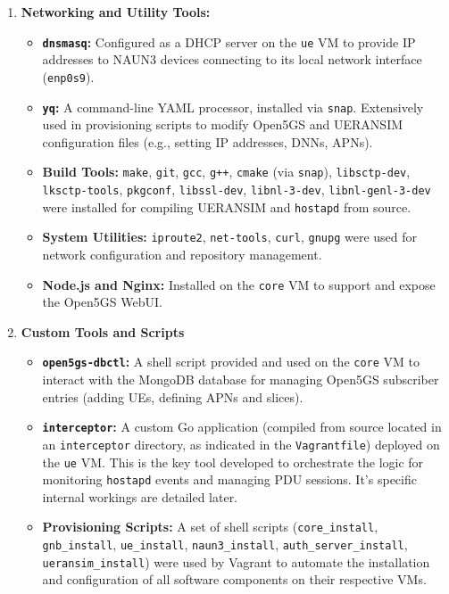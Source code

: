 \begin{enumerate}
    \item {
        \textbf{Networking and Utility Tools:}
        \begin{itemize}
            \item \textbf{\texttt{dnsmasq}:} Configured as a \ac{DHCP} server on the \texttt{ue} \ac{VM} to provide \ac{IP} addresses to \ac{NAUN3} devices connecting to its local network interface (\texttt{enp0s9}).

            \item \textbf{\texttt{yq}:} A command-line YAML processor, installed via \texttt{snap}. Extensively used in provisioning scripts to modify Open5GS and UERANSIM configuration files (e.g., setting \ac{IP} addresses, \acp{DNN}, \acp{APN}).

            \item \textbf{Build Tools:} \texttt{make}, \texttt{git}, \texttt{gcc}, \texttt{g++}, \texttt{cmake} (via \texttt{snap}), \texttt{libsctp-dev}, \texttt{lksctp-tools}, \texttt{pkgconf}, \texttt{libssl-dev}, \texttt{libnl-3-dev}, \texttt{libnl-genl-3-dev} were installed for compiling UERANSIM and \texttt{hostapd} from source.

            \item \textbf{System Utilities:} \texttt{iproute2}, \texttt{net-tools}, \texttt{curl}, \texttt{gnupg} were used for network configuration and repository management.

            \item \textbf{Node.js and Nginx:} Installed on the \texttt{core} \ac{VM} to support and expose the Open5GS WebUI.
        \end{itemize}
    }

    \item {
        \textbf{Custom Tools and Scripts}
        \begin{itemize}
            \item \textbf{\texttt{open5gs-dbctl}:} A shell script provided and used on the \texttt{core} VM to interact with the MongoDB database for managing Open5GS subscriber entries (adding \acp{UE}, defining \acp{APN} and slices).

            \item \textbf{\texttt{interceptor}:} A custom Go application (compiled from source located in an \texttt{interceptor} directory, as indicated in the \texttt{Vagrantfile}) deployed on the \texttt{ue} \ac{VM}. This is the key tool developed to orchestrate the logic for monitoring \texttt{hostapd} events and managing \ac{PDU} sessions. It's specific internal workings are detailed later.

            \item \textbf{Provisioning Scripts:} A set of shell scripts (\texttt{core\_install}, \texttt{gnb\_install}, \texttt{ue\_install}, \texttt{naun3\_install}, \texttt{auth\_server\_install}, \texttt{ueransim\_install}) were used by Vagrant to automate the installation and configuration of all software components on their respective \acp{VM}.
        \end{itemize}
    }
\end{enumerate}

